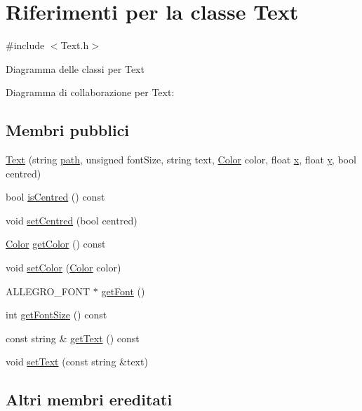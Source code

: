 \hypertarget{class_text}{}\section{Riferimenti per la classe Text}
\label{class_text}


{\ttfamily \#include $<$Text.\+h$>$}



Diagramma delle classi per Text


Diagramma di collaborazione per Text\+:
\subsection*{Membri pubblici}
\begin{DoxyCompactItemize}
\item 
\hyperlink{class_text_abf4428bf0a5ae41075df0e83ca27ebc8}{Text} (string \hyperlink{class_sprite_a8f128f4a40eb996f611c64c7d41b1584}{path}, unsigned font\+Size, string text, \hyperlink{struct_color}{Color} color, float \hyperlink{class_game_object_ad4976cd29785cf9bd791148ff397c41e}{x}, float \hyperlink{class_game_object_a9ac54f1c686ecf5656139a829ed62041}{y}, bool centred)
\item 
bool \hyperlink{class_text_af5925ff2d034bb0f1db2e6e262a26a91}{is\+Centred} () const
\item 
void \hyperlink{class_text_a05e4942876754c566e8787e3000bc63b}{set\+Centred} (bool centred)
\item 
\hyperlink{struct_color}{Color} \hyperlink{class_text_a00b30b00326b08d4277d0682ea17056a}{get\+Color} () const
\item 
void \hyperlink{class_text_a60ed7c4137d0389255e009a4b2bc7223}{set\+Color} (\hyperlink{struct_color}{Color} color)
\item 
A\+L\+L\+E\+G\+R\+O\+\_\+\+F\+O\+NT $\ast$ \hyperlink{class_text_a8fdfafd6574a3ec78667f5a7af64e225}{get\+Font} ()
\item 
int \hyperlink{class_text_af6db01e16738de0391ad928c54334f0e}{get\+Font\+Size} () const
\item 
const string \& \hyperlink{class_text_ad955f2a73bfd93cbfaeb21d43454a6c5}{get\+Text} () const
\item 
void \hyperlink{class_text_af0fcddcb8354f753947c371d634fabf9}{set\+Text} (const string \&text)
\end{DoxyCompactItemize}
\subsection*{Altri membri ereditati}


